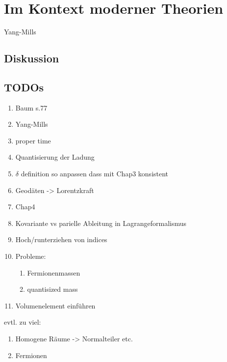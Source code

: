 \chapter{Im Kontext moderner Theorien}
Yang-Mills
\section{Diskussion}
\section{TODOs}
\begin{enumerate}
\item Baum s.77
  \item Yang-Mills
  \item proper time
  \item Quantisierung der Ladung
  \item $\delta$ definition so anpassen dass mit Chap3 konsistent
  \item Geodäten -> Lorentzkraft
  \item Chap4
  \item Kovariante vs parielle Ableitung in Lagrangeformalismus
  \item Hoch/runterziehen von indices
  \item Probleme:
  \begin{enumerate}
   \item Fermionenmassen
   \item quantisized mass
   \end{enumerate}
\item Volumenelement einführen

    
\end{enumerate}
evtl. zu viel:
\begin{enumerate}
   \item Homogene Räume -> Normalteiler etc.
     \item Fermionen
\end{enumerate}